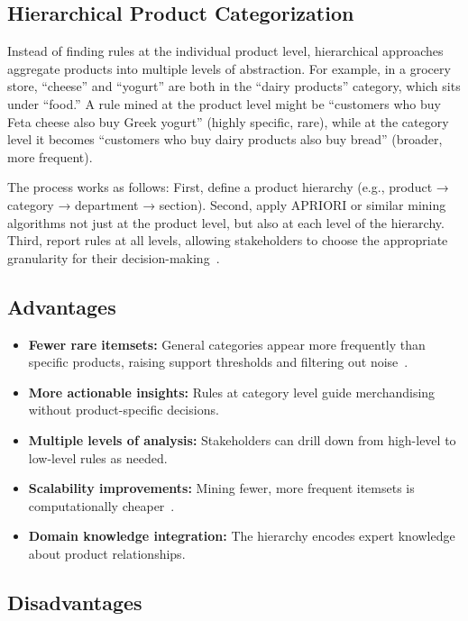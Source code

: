 \documentclass[runningheads]{llncs}
\begin{document}
\subsection*{Hierarchical Product Categorization}

Instead of finding rules at the individual product level, hierarchical approaches aggregate products into multiple levels of abstraction. For example, in a grocery store, ``cheese'' and ``yogurt'' are both in the ``dairy products'' category, which sits under ``food.'' A rule mined at the product level might be ``customers who buy Feta cheese also buy Greek yogurt'' (highly specific, rare), while at the category level it becomes ``customers who buy dairy products also buy bread'' (broader, more frequent).

The process works as follows: First, define a product hierarchy (e.g., product → category → department → section). Second, apply APRIORI or similar mining algorithms not just at the product level, but also at each level of the hierarchy. Third, report rules at all levels, allowing stakeholders to choose the appropriate granularity for their decision-making~\cite{srikant_1997}.

\subsection*{Advantages}

\begin{itemize}
\item \textbf{Fewer rare itemsets:} General categories appear more frequently than specific products, raising support thresholds and filtering out noise~\cite{srikant_1997}.
\item \textbf{More actionable insights:} Rules at category level guide merchandising without product-specific decisions.
\item \textbf{Multiple levels of analysis:} Stakeholders can drill down from high-level to low-level rules as needed.
\item \textbf{Scalability improvements:} Mining fewer, more frequent itemsets is computationally cheaper~\cite{srikant_1997}.
\item \textbf{Domain knowledge integration:} The hierarchy encodes expert knowledge about product relationships.
\end{itemize}

\subsection*{Disadvantages}
\end{document}
